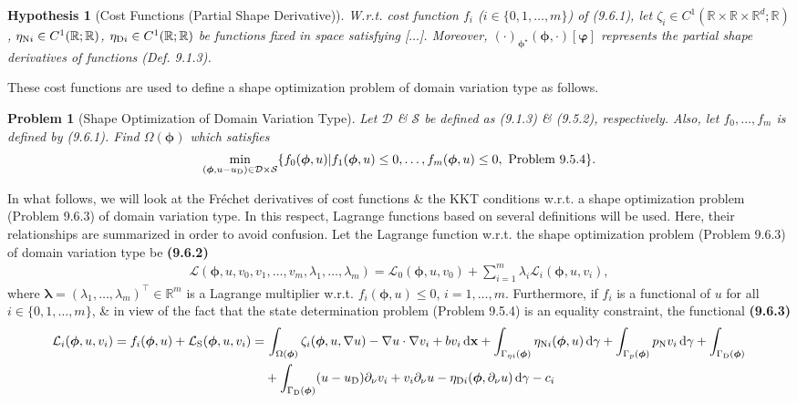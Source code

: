 \documentclass[oneside]{book}
\numberwithin{equation}{section}
\newtheorem{hypothesis}{Hypothesis}[chapter]
\newtheorem{problem}{Problem}[chapter]
\begin{document}
\begin{hypothesis}[Cost Functions (Partial Shape Derivative)]
	W.r.t. cost function $f_i$ ($i\in\{0,1,\ldots,m\}$) of (9.6.1), let $\zeta_i\in C^1(\mathbb{R}\times\mathbb{R}\times\mathbb{R}^d;\mathbb{R})$, $\eta_{{\rm N}i}\in C^1(\mathbb{R};\mathbb{R})$, $\eta_{{\rm D}i}\in C^1(\mathbb{R};\mathbb{R})$ be functions fixed in space satisfying [$\ldots$]. Moreover, $(\cdot)_{\boldsymbol{\phi}^\star}(\boldsymbol{\phi},\cdot)[\boldsymbol{\varphi}]$ represents the partial shape derivatives of functions (Def. 9.1.3).
\end{hypothesis}
These cost functions are used to define a shape optimization problem of domain variation type as follows.

\begin{problem}[Shape Optimization of Domain Variation Type]
	Let $\mathcal{D}$ \& $\mathcal{S}$ be defined as (9.1.3) \& (9.5.2), respectively. Also, let $f_0,\ldots,f_m$ is defined by (9.6.1). Find $\Omega(\boldsymbol{\phi})$ which satisfies
	\begin{align*}
		\min_{(\boldsymbol{\phi},u - u_{\rm D})\in\mathcal{D}\times\mathcal{S}} \{f_0(\boldsymbol{\phi},u)|f_1(\boldsymbol{\phi},u)\le 0,\ldots,f_m(\boldsymbol{\phi},u)\le 0,\mbox{ Problem 9.5.4}\}.
	\end{align*}
\end{problem}
In what follows, we will look at the Fr\'echet derivatives of cost functions \& the KKT conditions w.r.t. a shape optimization problem (Problem 9.6.3) of domain variation type. In this respect, Lagrange functions based on several definitions will be used. Here, their relationships are summarized in order to avoid confusion. Let the Lagrange function w.r.t. the shape optimization problem (Problem 9.6.3) of domain variation type be \textbf{(9.6.2)}
\begin{align*}
	\mathcal{L}(\boldsymbol{\phi},u,v_0,v_1,\ldots,v_m,\lambda_1,\ldots,\lambda_m) = \mathcal{L}_0(\boldsymbol{\phi},u,v_0) + \sum_{i=1}^m \lambda_i\mathcal{L}_i(\boldsymbol{\phi},u,v_i),
\end{align*}
where $\boldsymbol{\lambda} = (\lambda_1,\ldots,\lambda_m)^\top\in\mathbb{R}^m$ is a Lagrange multiplier w.r.t. $f_i(\boldsymbol{\phi},u)\le 0$, $i = 1,\ldots,m$. Furthermore, if $f_i$ is a functional of $u$ for all $i\in\{0,1,\ldots,m\}$, \& in view of the fact that the state determination problem (Problem 9.5.4) is an equality constraint, the functional \textbf{(9.6.3)}
\begin{align*}
	\mathcal{L}_i(\boldsymbol{\phi},u,v_i) = f_i(\boldsymbol{\phi},u) + \mathcal{L}_{\rm S}(\boldsymbol{\phi},u,v_i) =&\, \int_{\Omega(\boldsymbol{\phi})} \zeta_i(\boldsymbol{\phi},u,\nabla u) - \nabla u\cdot\nabla v_i + bv_i\,{\rm d}{\bf x} + \int_{\Gamma_{\eta i}(\boldsymbol{\phi})} \eta_{{\rm N}i}(\boldsymbol{\phi},u)\,{\rm d}\gamma + \int_{\Gamma_p(\boldsymbol{\phi})} p_{\rm N}v_i\,{\rm d}\gamma + \int_{\Gamma_{\rm D}(\boldsymbol{\phi})}\\
	&+ \int_{\Gamma_{\rm D}(\boldsymbol{\phi})} (u - u_{\rm D})\partial_\nu v_i + v_i\partial_\nu u - \eta_{{\rm D}i}(\boldsymbol{\phi},\partial_\nu u)\,{\rm d}\gamma - c_i
\end{align*}
\end{document}
